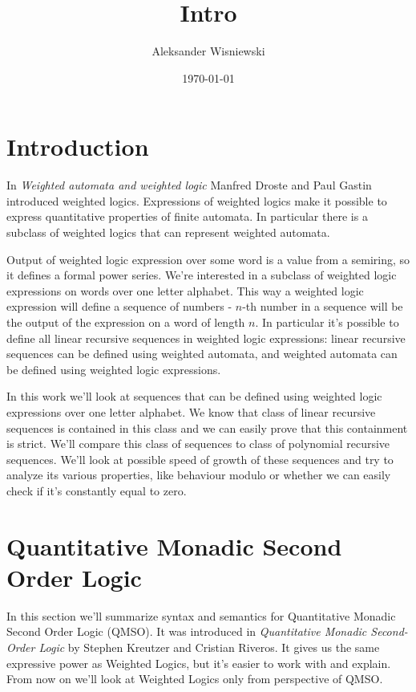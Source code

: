 \documentclass[12pt]{article}
\title{Intro}
\author{Aleksander Wisniewski}
\date{\today}
\newcommand{\ifilip}[1]{\todo[inline,color=green!10]{{\bf Filip:} #1}}
\theoremstyle{definition}
\begin{document}
\maketitle

\ifilip{Filip: Intro, sekcja 3}

\section{Introduction}
In \textit{Weighted automata and weighted logic} Manfred Droste and Paul Gastin introduced weighted logics. Expressions of weighted logics make it possible to express quantitative properties of finite automata. In particular there is a subclass of weighted logics that can represent weighted automata. 

Output of weighted logic expression over some word is a value from a semiring, so it defines a formal power series. We're interested in a subclass of weighted logic expressions on words over one letter alphabet. This way a weighted logic expression will define a sequence of numbers - $n$-th number in a sequence will be the output of the expression on a word of length $n$. In particular it's possible to define all linear recursive sequences in weighted logic expressions: linear recursive sequences can be defined using weighted automata, and weighted automata can be defined using weighted logic expressions.

In this work we'll look at sequences that can be defined using weighted logic expressions over one letter alphabet. We know that class of linear recursive sequences is contained in this class and we can easily prove that this containment is strict. We'll compare this class of sequences to class of polynomial recursive sequences. We'll look at possible speed of growth of these sequences and try to analyze its various properties, like behaviour modulo or whether we can easily check if it's constantly equal to zero.

\section{Quantitative Monadic Second Order Logic}
In this section we'll summarize syntax and semantics for Quantitative Monadic Second Order Logic (QMSO). It was introduced in \textit{Quantitative Monadic Second-Order Logic} by Stephen Kreutzer and Cristian Riveros. It gives us the same expressive power as Weighted Logics, but it's easier to work with and explain. From now on we'll look at Weighted Logics only from perspective of QMSO.
\end{document}
